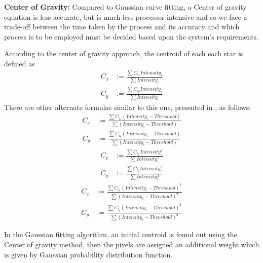 \documentclass[../../main.tex]{subfiles}
\begin{document}
\textbf{Center of Gravity:}
Compared to Gaussian curve fitting, a Center of gravity equation is less accurate, but is much less processor-intensive and so we face a trade-off between the time taken by the process and its accuracy and which process is to be employed must be decided based upon the system's requirements.

According to the center of gravity approach, the centroid of each each star is defined as
\begin{equation}
\boxed{
\begin{aligned}
    C_{x} & := \frac{\sum C_{i_{x}}Intensity_{i}}{\sum Intensity_{i}}\\
    C_{y} & := \frac{\sum C_{i_{y}}Intensity_{i}}{\sum Intensity_{i}}
\end{aligned}
}
\end{equation}
There are other alternate formulae similar to this one, presented in \cite{zhang2011star}, as follows:
\begin{equation}
\boxed{
\begin{aligned}
    C_{x} & := \frac{\sum C_{i_{x}}(Intensity_{i}-Threshold)}{\sum (Intensity_{i}-Threshold)}\\
    C_{y} & := \frac{\sum C_{i_{y}}(Intensity_{i}-Threshold)}{\sum (Intensity_{i}-Threshold)}
\end{aligned}
}
\end{equation}
\begin{equation}
\boxed{
\begin{aligned}
    C_{x} & := \frac{\sum C_{i_{x}}Intensity^2_{i}}{\sum Intensity^2_{i}}\\
    C_{y} & := \frac{\sum C_{i_{y}}Intensity^2_{i}}{\sum Intensity^2_{i}}
\end{aligned}
}
\end{equation}
\begin{equation}
\boxed{
\begin{aligned}
    C_{x} & := \frac{\sum C_{i_{x}}(Intensity_{i}-Threshold)^2}{\sum (Intensity_{i}-Threshold)^2}\\
    C_{y} & := \frac{\sum C_{i_{y}}(Intensity_{i}-Threshold)^2}{\sum (Intensity_{i}-Threshold)^2}
\end{aligned}
}
\end{equation}


In the Gaussian fitting algorithm, an initial centroid is found out using the Center of gravity method, then the pixels are assigned an additional weight which is given by Gaussian probability distribution function.
\end{document}
